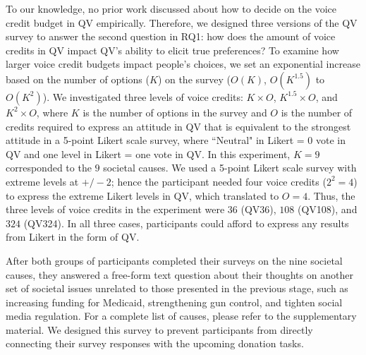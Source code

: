 To our knowledge, no prior work discussed about how to decide on the voice credit budget in QV empirically. Therefore, we designed three versions of the QV survey to answer the second question in RQ1: how does the amount of voice credits in QV impact QV's ability to elicit true preferences? To examine how larger voice credit budgets impact people's choices, we set an exponential increase based on the number of options ($K$) on the survey ($O(K)$, $O(K^{1.5})$ to $O(K^2)$). We investigated three levels of voice credits: $K \times O$, $K^{1.5} \times O$, and $K^2 \times O$, where $K$ is the number of options in the survey and $O$ is the number of credits required to express an attitude in QV that is equivalent to the strongest attitude in a 5-point Likert scale survey, where ``Neutral" in Likert = 0 vote in QV and one level in Likert = one vote in QV. In this experiment, $K=9$ corresponded to the $9$ societal causes. We used a 5-point Likert scale survey with extreme levels at $+/-2$; hence the participant needed four voice credits ($2^2=4$) to express the extreme Likert levels in QV, which translated to $O=4$. Thus, the three levels of voice credits in the experiment were $36$ (QV36), $108$ (QV108), and $324$ (QV324). In all three cases, participants could afford to express any results from Likert in the form of QV. 
{}

{} After both groups of participants completed their surveys on the nine societal causes, {} they answered a free-form text question about their thoughts on another set of societal issues unrelated to those presented in the previous stage, such as increasing funding for Medicaid, strengthening gun control, and tighten social media regulation. For a complete list of causes, please refer to the supplementary material. {} We designed this survey to prevent participants from directly connecting their survey responses with the upcoming donation tasks.

